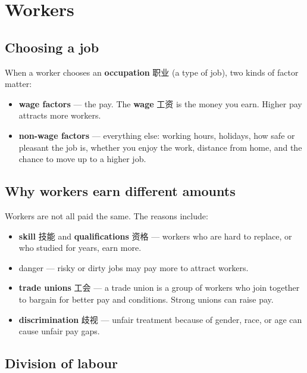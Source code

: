 \documentclass[11pt]{article}
\begin{document}
\section*{Workers}

\subsection*{Choosing a job}

When a worker chooses an \textbf{occupation} 职业 (a type of job), two kinds of factor matter:

\begin{itemize}
\item \textbf{wage factors} — the pay. The \textbf{wage} 工资 is the money you earn. Higher pay attracts more workers.

\item \textbf{non-wage factors} — everything else: working hours, holidays, how safe or pleasant the job is, whether you enjoy the work, distance from home, and the chance to move up to a higher job.

\end{itemize}

\subsection*{Why workers earn different amounts}

Workers are not all paid the same. The reasons include:

\begin{itemize}
\item \textbf{skill} 技能 and \textbf{qualifications} 资格 — workers who are hard to replace, or who studied for years, earn more.

\item danger — risky or dirty jobs may pay more to attract workers.

\item \textbf{trade unions} 工会 — a trade union is a group of workers who join together to bargain for better pay and conditions. Strong unions can raise pay.

\item \textbf{discrimination} 歧视 — unfair treatment because of gender, race, or age can cause unfair pay gaps.

\end{itemize}

\subsection*{Division of labour}
\end{document}
